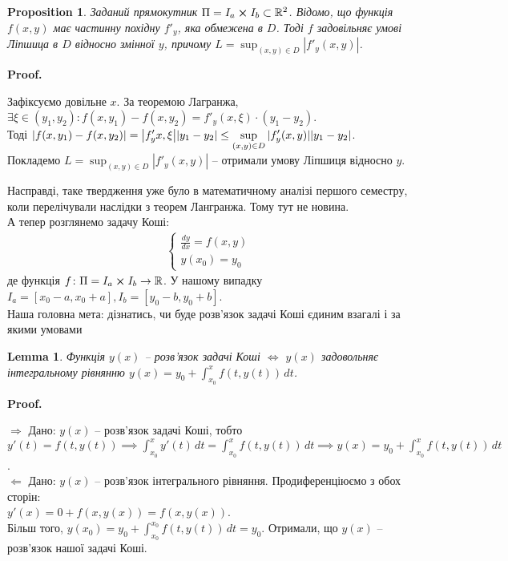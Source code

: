 \documentclass[a4paper, 10pt]{article}
\makeatletter
\def\qed{$\blacksquare$}
\def\rightproof{$\boxed{\Rightarrow}$ }
\def\leftproof{$\boxed{\Leftarrow}$ }
\theoremstyle{theoremdd}
\theoremstyle{theoremdd}
\theoremstyle{theoremdd}
\theoremstyle{theoremdd}
\theoremstyle{theoremdd}
\newtheorem{proposition}[theorem]{Proposition}
\theoremstyle{theoremdd}
\theoremstyle{theoremdd}
\newtheorem{lemma}[theorem]{Lemma}
\theoremstyle{theoremdd}
\renewenvironment{proof}[1][Proof.\\]{\par
\pushQED{\hfill \qed}%
\normalfont \topsep6\p@\@plus6\p@\relax
\trivlist
\item\relax
{\bfseries
#1\@addpunct{.}}\hspace\labelsep\ignorespaces
}{%
\popQED\endtrivlist\@endpefalse
}
\makeatother
\begin{document}
	\begin{proposition}
 Заданий прямокутник $\Pi = I_a \cross I_b \subset \mathbb{R}^2$. Відомо, що функція $f(x,y)$ має частинну похідну $f'_y$, яка обмежена в $D$. Тоді $f$ задовільняє умові Ліпшица в $D$ відносно змінної $y$, причому $\displaystyle L = \sup_{(x,y) \in D} |f'_y(x,y)|$.
	\end{proposition}

	\begin{proof}
	Зафіксуємо довільне $x$. За теоремою Лагранжа, $\exists \xi \in (y_1, y_2): f(x,y_1) - f(x,y_2) = f'_y(x, \xi)\cdot(y_1-y_2)$. \\ Тоді $\displaystyle \abs{f(x,y_1) - f(x,y_2)} = \abs{f'_y{x, \xi}} \abs{y_1 - y_2} \leq \displaystyle \sup_{(x,y) \in D} |f'_y(x,y)| \abs{y_1-y_2}$.\\
	Покладемо $\displaystyle L = \sup_{(x,y) \in D} |f'_y(x,y)|$ -- отримали умову Ліпшиця відносно $y$.
	\end{proof}
	
	Насправді, таке твердження уже було в математичному аналізі першого семестру, коли перелічували наслідки з теорем Лангранжа. Тому тут не новина.
	\bigskip \\
	А тепер розглянемо задачу Коші:
	\begin{align*}
	\begin{cases}
	\displaystyle \frac{dy}{dx}=f(x,y)\\
	y(x_0)=y_0
	\end{cases}
	\end{align*}
	де функція $f \colon \Pi = I_a \cross I_b \to \mathbb{R}$. У нашому випадку $I_a = [x_0-a, x_0+a], I_b = [y_0-b, y_0+b]$.\\
	Наша головна мета: дізнатись, чи буде розв'язок задачі Коші єдиним взагалі і за якими умовами
	
	\begin{lemma}
 Функція $y(x)$ -- розв'язок задачі Коші $\iff$ $y(x)$ задовольняє інтегральному рівнянню $\displaystyle y(x) = y_0 + \int_{x_0}^x f(t,y(t))\,dt$.
	\end{lemma}
	
	\begin{proof}
	\rightproof Дано: $y(x)$ -- розв'язок задачі Коші, тобто\\
	$\displaystyle y'(t) = f(t,y(t)) \implies \int_{x_0}^x y'(t)\,dt = \int_{x_0}^x f(t,y(t))\,dt \implies y(x) = y_0 +  \int_{x_0}^x f(t,y(t))\,dt$.
	\bigskip \\
	\leftproof Дано: $y(x)$ -- розв'язок інтегрального рівняння. Продиференціюємо з обох сторін:\\
	$\displaystyle y'(x) = 0 + f(x,y(x)) = f(x,y(x))$.\\
	Більш того, $\displaystyle y(x_0) = y_0 + \int_{x_0}^{x_0} f(t,y(t))\,dt = y_0$. Отримали, що $y(x)$ -- розв'язок нашої задачі Коші.
	\end{proof}
	
\end{document}
